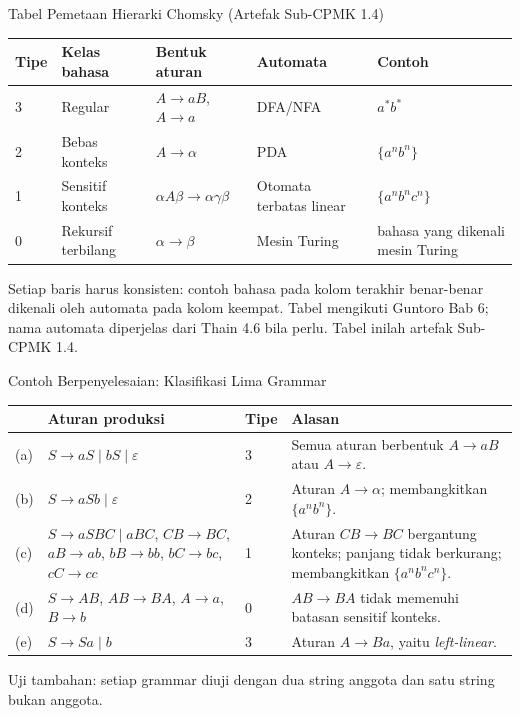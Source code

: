 \documentclass[aspectratio=169,10pt,t]{beamer}
\begin{document}
\begin{frame}{Tabel Pemetaan Hierarki Chomsky (Artefak Sub-CPMK 1.4)}
  \small
  \setlength{\tabcolsep}{4pt}
  \begin{tabular}{@{}p{0.8cm}p{2.7cm}p{4.6cm}p{3.3cm}p{1.9cm}@{}}
    \toprule
    \textbf{Tipe} & \textbf{Kelas bahasa} & \textbf{Bentuk aturan} &
    \textbf{Automata} & \textbf{Contoh} \\
    \midrule
    3 & Regular & \(A \to aB\), \(A \to a\) & DFA/NFA &
      \(a^{*}b^{*}\) \\
    2 & Bebas konteks & \(A \to \alpha\) & PDA &
      \(\{a^n b^n\}\) \\
    1 & Sensitif konteks & \(\alpha A\beta \to \alpha\gamma\beta\) &
      Otomata terbatas linear & \(\{a^n b^n c^n\}\) \\
    0 & Rekursif terbilang & \(\alpha \to \beta\) & Mesin Turing &
      bahasa yang dikenali mesin Turing \\
    \bottomrule
  \end{tabular}

  \vspace{6pt}
  {\footnotesize\color{ubbblue!80}Setiap baris harus konsisten: contoh
  bahasa pada kolom terakhir benar-benar dikenali oleh automata pada
  kolom keempat. Tabel mengikuti Guntoro Bab 6; nama automata
  diperjelas dari Thain 4.6 bila perlu. Tabel inilah artefak
  Sub-CPMK 1.4.}
\end{frame}

\begin{frame}{Contoh Berpenyelesaian: Klasifikasi Lima Grammar}
  \scriptsize
  \setlength{\tabcolsep}{4pt}
  \begin{tabular}{@{}p{0.5cm}p{5.4cm}p{1.4cm}p{6.4cm}@{}}
    \toprule
    & \textbf{Aturan produksi} & \textbf{Tipe} & \textbf{Alasan} \\
    \midrule
    (a) & \(S \to aS \mid bS \mid \varepsilon\) & 3 &
      Semua aturan berbentuk \(A \to aB\) atau \(A \to \varepsilon\). \\
    (b) & \(S \to aSb \mid \varepsilon\) & 2 &
      Aturan \(A \to \alpha\); membangkitkan \(\{a^n b^n\}\). \\
    (c) & \(S \to aSBC \mid aBC\), \(CB \to BC\), \(aB \to ab\),
      \(bB \to bb\), \(bC \to bc\), \(cC \to cc\) & 1 &
      Aturan \(CB \to BC\) bergantung konteks; panjang tidak berkurang;
      membangkitkan \(\{a^n b^n c^n\}\). \\
    (d) & \(S \to AB\), \(AB \to BA\), \(A \to a\), \(B \to b\) & 0 &
      \(AB \to BA\) tidak memenuhi batasan sensitif konteks. \\
    (e) & \(S \to Sa \mid b\) & 3 &
      Aturan \(A \to Ba\), yaitu \textit{left-linear}. \\
    \bottomrule
  \end{tabular}

  \vspace{5pt}
  {\scriptsize\color{ubbblue!75}Uji tambahan: setiap grammar diuji
  dengan dua string anggota dan satu string bukan anggota.}
\end{frame}
\end{document}
